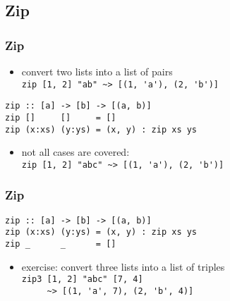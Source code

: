 \documentclass[dvipsnames]{beamer}
\theoremstyle{plain}
\begin{document}
\subsection{Zip}

\begin{frame}[fragile]
  \frametitle{Zip}

  \begin{itemize}
    \item convert two lists into a list of pairs\\
      \lstinline[style=exclamfix]|zip [1, 2] "ab" ~> [(1, 'a'), (2, 'b')]|
  \end{itemize}

  \begin{exampleblock}{}
    \begin{lstlisting}[deletekeywords={zip}]
zip :: [a] -> [b] -> [(a, b)]
zip []     []     = []
zip (x:xs) (y:ys) = (x, y) : zip xs ys
    \end{lstlisting}
  \end{exampleblock}

  \pause
  \begin{itemize}
    \item not all cases are covered:\\
      \lstinline[style=exclamfix]|zip [1, 2] "abc" ~> [(1, 'a'), (2, 'b')]|
  \end{itemize}
\end{frame}

\begin{frame}[fragile]
  \frametitle{Zip}

  \begin{exampleblock}{}
    \begin{lstlisting}[deletekeywords={zip}]
zip :: [a] -> [b] -> [(a, b)]
zip (x:xs) (y:ys) = (x, y) : zip xs ys
zip _      _      = []
    \end{lstlisting}
  \end{exampleblock}

  \pause
  \begin{itemize}
    \item exercise: convert three lists into a list of triples\\
      \lstinline[style=exclamfix]|zip3 [1, 2] "abc" [7, 4]|\\
      \lstinline[style=exclamfix]|     ~> [(1, 'a', 7), (2, 'b', 4)]|
  \end{itemize}
\end{frame}
\end{document}
